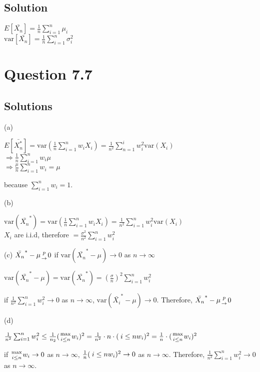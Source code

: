 \documentclass[10pt, a4paper]{article}
\begin{document}
    \subsection{Solution}
    \begin{center}
      $E[\bar{X_n}] = \frac{1}{n}\sum^n_{i=1}\mu_i$ \\
      $\mathrm{var}[\bar{X_n}]=\frac{1}{n}\sum^n_{i=1}\sigma_i^2$
    \end{center}
  \section{Question 7.7}
    \subsection{Solutions}
    (a) 
    \begin{center}
      $E[\bar{X_n^*}]=\mathrm{var}(\frac{1}{n}\sum^n_{i=1}w_iX_i)=\frac{1}{n^2}\sum^i_{n=1}w_i^2\mathrm{var}(X_i)$ \\ 
      $\Rightarrow \frac{1}{n}\sum^n_{i=1}w_i\mu$ \\
      $\Rightarrow \frac{\mu}{n}\sum_{i=1}^nw_i=\mu$
    \end{center}
    because $\sum_{i=1}^nw_i=1$.

    (b) 
    \begin{center}
      $\mathrm{var}(\bar{X_n}^*)=\mathrm{var}(\frac{1}{n}\sum^n_{i=1}w_iX_i)=\frac{1}{n^2}\sum^{n}_{i=1}w_i^2\mathrm{var}(X_i)$ \\
      $X_i$ are i.i.d, therefore $=\frac{\sigma^2}{n^2}\sum_{i=1}^nw_i^2$ 
    \end{center}

    (c)
    $\bar{X_n}^*-\mu{p\atop{\rightarrow}}0$ if $\mathrm{var}(\bar{X_n}^*-\mu)\rightarrow0$ as $n\rightarrow\infty$
    \begin{center}
      $\mathrm{var}(\bar{X_n}^*-\mu)=\mathrm{var}(\bar{X_n}^*)=(\frac{\sigma}{n})^2\sum^n_{i=1}w_i^2$ \\
    \end{center}
    if $\frac{1}{n^2}\sum^n_{i=1}w_i^2\rightarrow0$ as $n\rightarrow\infty$, $\mathrm{var}(\bar{X_i}^*-\mu)\rightarrow0$. Therefore, $\bar{X_n}^*-\mu{p\atop{\rightarrow}}0$ 

    (d)
    \begin{center}
      $\frac{1}{n^2}\sum^n_{i=1}w_i^2\leq\frac{1}{n_2}({\mathrm{max}\atop{i\leq n}}w_i)^2=\frac{1}{n^2}\cdot n\cdot({\mathrm\atop{i\leq n}}w_i)^2=\frac{1}{n}\cdot({\mathrm{max}\atop{i\leq n}}w_i)^2$
    \end{center}
    if ${\mathrm{max}\atop{i\leq n}}w_i\rightarrow0$ as $n\rightarrow\infty$, $\frac{1}{n}({\mathrm\atop{i\leq n}}w_i)^2\rightarrow0$ as $n\rightarrow\infty$. Therefore, $\frac{1}{n^2}\sum_{i=1}^nw_i^2\rightarrow0$ as $n\rightarrow\infty$. 
\end{document}
